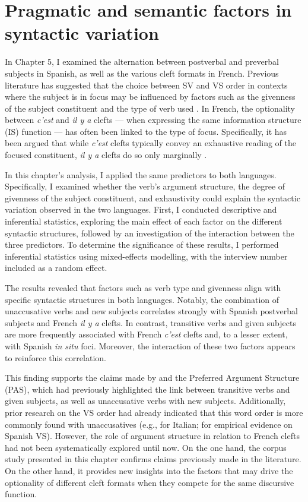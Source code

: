 \section{Pragmatic and semantic factors in syntactic variation} %


In Chapter 5, I examined the alternation between postverbal and preverbal subjects in Spanish, as well as the various cleft formats in French. Previous literature has suggested that the choice between SV and VS order in contexts where the subject is in focus may be influenced by factors such as the givenness of the subject constituent and the type of verb used \parencite{gabriel2007fokus}. In French, the optionality between \textit{c'est} and \textit{il y a} clefts — when expressing the same information structure (IS) function — has often been linked to the type of focus. Specifically, it has been argued that while \textit{c'est} clefts typically convey an exhaustive reading of the focused constituent, \textit{il y a} clefts do so only marginally \parencite{de2015status, karssenberg2017oiseaux}.

In this chapter's analysis, I applied the same predictors to both languages. Specifically, I examined whether the verb’s argument structure, the degree of givenness of the subject constituent, and exhaustivity could explain the syntactic variation observed in the two languages. First, I conducted descriptive and inferential statistics, exploring the main effect of each factor on the different syntactic structures, followed by an investigation of the interaction between the three predictors. To determine the significance of these results, I performed inferential statistics using mixed-effects modelling, with the interview number included as a random effect.

The results revealed that factors such as verb type and givenness align with specific syntactic structures in both languages. Notably, the combination of unaccusative verbs and new subjects correlates strongly with Spanish postverbal subjects and French \textit{il y a} clefts. In contrast, transitive verbs and given subjects are more frequently associated with French \textit{c'est} clefts and, to a lesser extent, with Spanish \textit{in situ} foci. Moreover, the interaction of these two factors appears to reinforce this correlation.

This finding supports the claims made by \textcite{du2003preferred} and the Preferred Argument Structure (PAS), which had previously highlighted the link between transitive verbs and given subjects, as well as unaccusative verbs with new subjects. Additionally, prior research on the VS order had already indicated that this word order is more commonly found with unaccusatives (e.g., \cite{burzio1986italian} for Italian; \cite{gabriel2007fokus} for empirical evidence on Spanish VS). However, the role of argument structure in relation to French clefts had not been systematically explored until now. On the one hand, the corpus study presented in this chapter confirms claims previously made in the literature. On the other hand, it provides new insights into the factors that may drive the optionality of different cleft formats when they compete for the same discursive function.

